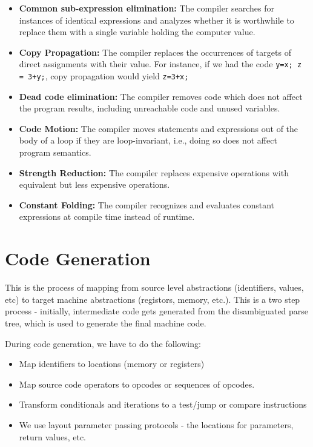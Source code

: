 \documentclass[12pt,letterpaper]{amsbook}
\theoremstyle{definition}
\begin{document}
\begin{itemize}
  \item \textbf{Common sub-expression elimination:} The compiler searches for instances of identical expressions and analyzes whether it is worthwhile to replace them with a single variable holding the computer value.
  \item \textbf{Copy Propagation:} The compiler replaces the occurrences of targets of direct assignments with their value. For instance, if we had the code \texttt{y=x; z = 3+y;}, copy propagation would yield \texttt{z=3+x;}
  \item \textbf{Dead code elimination:} The compiler removes code which does not affect the program results, including unreachable code and unused variables.
  \item \textbf{Code Motion:} The compiler moves statements and expressions out of the body of a loop if they are loop-invariant, i.e., doing so does not affect program semantics.
  \item \textbf{Strength Reduction:} The compiler replaces expensive operations with equivalent but less expensive operations.
  \item \textbf{Constant Folding:} The compiler recognizes and evaluates constant expressions at compile time instead of runtime.
\end{itemize}

\section{Code Generation}

This is the process of mapping from source level abstractions (identifiers, values, etc) to target machine abstractions (registors, memory, etc.). This is a two step process - initially, intermediate code gets generated from the disambiguated parse tree, which is used to generate the final machine code.

During code generation, we have to do the following:

\begin{itemize}
  \item Map identifiers to locations (memory or registers)
  \item Map source code operators to opcodes or sequences of opcodes.
  \item Transform conditionals and iterations to a test/jump or compare instructions
  \item We use layout parameter passing protocols - the locations for parameters, return values, etc.
\end{itemize}
\end{document}
